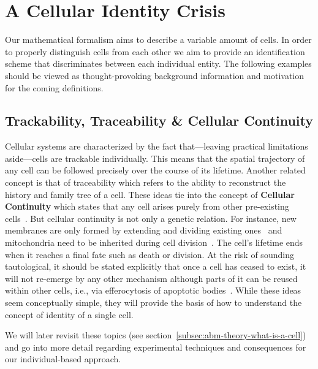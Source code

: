 \section{A Cellular Identity Crisis}
Our mathematical formalism aims to describe a variable amount of cells.
In order to properly distinguish cells from each other we aim to provide an identification scheme
that discriminates between each individual entity.
The following examples should be viewed as thought-provoking background information and motivation
for the coming definitions.

\subsection{Trackability, Traceability \& Cellular Continuity}
Cellular systems are characterized by the fact that---leaving practical limitations aside---cells
are trackable individually.
This means that the spatial trajectory of any cell can be followed precisely over the course of its
lifetime.
Another related concept is that of traceability which refers to the ability to reconstruct the
history and family tree of a cell.
These ideas tie into the concept of \textbf{Cellular Continuity} which states that any cell arises
purely from other pre-existing cells~\cite{Mazzarello1999}.
But cellular continuity is not only a genetic relation.
For instance, new membranes are only formed by extending and dividing existing
ones~\cite{Harold2005} and mitochondria need to be inherited during cell
division~\cite{Westermann2010}.
The cell's lifetime ends when it reaches a final fate such as death or division.
At the risk of sounding tautological, it should be stated explicitly that once a cell has ceased to
exist, it will not re-emerge by any other mechanism although parts of it can be reused within other
cells, i.e., via efferocytosis of apoptotic bodies~\cite{deCathelineau2003,Poon2014,Yu2023}.
While these ideas seem conceptually simple, they will provide the basis of how to understand the
concept of identity of a single cell.

We will later revisit these topics (see section~\ref{subsec:abm-theory-what-is-a-cell})
and go into more detail regarding experimental techniques and consequences for our individual-based
approach.

